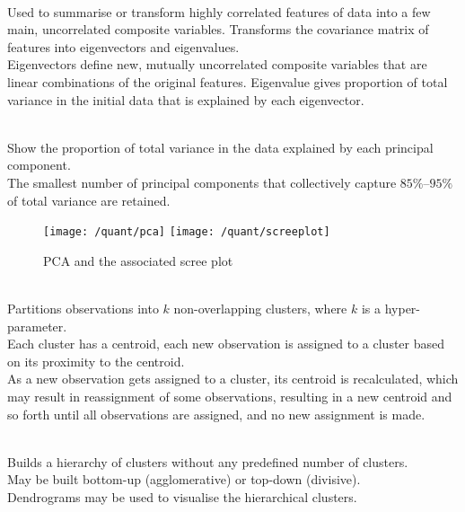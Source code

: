 \begin{definition} \\
Used to summarise or transform highly correlated features of data into a few main, uncorrelated composite variables. Transforms the covariance matrix of features into eigenvectors and eigenvalues.\\
Eigenvectors define new, mutually uncorrelated composite variables that are linear combinations of the original features. Eigenvalue gives proportion of total variance in the initial data that is explained by each eigenvector.
\end{definition}

\begin{definition} \\
Show the proportion of total variance in the data explained by each principal component.\\
The smallest number of principal components that collectively capture $85\%–95\%$ of total variance are retained.
\end{definition}

\begin{figure}[H]
\centering
\texttt{[image: /quant/pca]}
\texttt{[image: /quant/screeplot]}
\caption{PCA and the associated scree plot}
\end{figure}

\begin{definition} \\
Partitions observations into $k$ non-overlapping clusters, where $k$ is a hyper-parameter.\\
Each cluster has a centroid, each new observation is assigned to a cluster based on its proximity to the centroid.\\
As a new observation gets assigned to a cluster, its centroid is recalculated, which may result in reassignment of some observations, resulting in a new centroid and so forth until all observations are assigned, and no new assignment is made.
\end{definition}

\begin{definition} \\
Builds a hierarchy of clusters without any predefined number of clusters.\\
May be built bottom-up (agglomerative) or top-down (divisive).\\
Dendrograms may be used to visualise the hierarchical clusters.
\end{definition}

